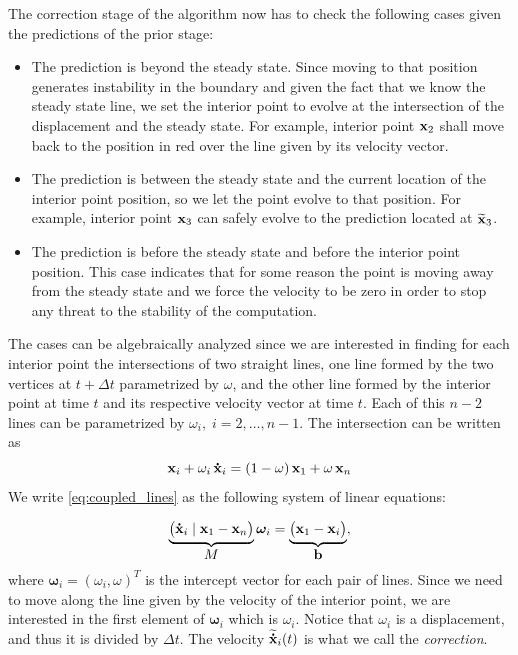 The correction stage of the algorithm now has to check the following cases given the predictions of the prior stage:
\begin{itemize}
    \item The prediction is beyond the steady state. 
    Since moving to that position generates instability in the boundary and given the fact that we know the steady state line, we set the interior point to evolve at the intersection of the displacement and the steady state. For example, interior point $\x_2$ shall move back to the position in red over the line given by its velocity vector.
    \item The prediction is between the steady state and the current location of the interior point position, so
    we let the point evolve to that position. 
    For example, interior point $\x_3$ can safely evolve to the prediction located at $\widetilde{\x}_3$.
    \item The prediction is before the steady state and before the interior point position.
    This case indicates that for some reason the point is moving away from the steady state and we force the velocity to be zero in order to stop any threat to the stability of the computation.
\end{itemize}
The cases can be algebraically analyzed since we are interested in finding for each interior point the intersections of two straight lines, one line formed by the two vertices at $t+\Delta t$ parametrized by $\omega$, and the other line formed by the interior point at time $t$ and its respective velocity vector at time $t$. Each of this $n-2$ lines can be parametrized by $\omega_i,\; i=2,\ldots,n-1$. The intersection can be written as
%
\begin{equation}
    \x_i + \omega_i\,\dotx_i=
    (1-\omega)\,\x_1 + \omega\, \x_n \label{eq:coupled_lines}
\end{equation}
%
We write \eqref{eq:coupled_lines} as the following system of linear equations:

\begin{equation*}
    \underbrace{\begin{pmatrix}
    \dotx_i \;|\; \x_1 - \x_n
    \end{pmatrix}}_{\displaystyle M} \bm{\omega}_i = \underbrace{\begin{pmatrix}
    \x_1 - \x_i
    \end{pmatrix}}_{\displaystyle \mathbf{b}},
\end{equation*}
where $\bm{\omega}_i = (\omega_i, \omega)^T$ is the intercept vector for each pair of lines. 
Since we need to move along the line given by the velocity of the interior point, we are interested in the first element of $\bm{\omega}_i$ which is $\omega_i$.
Notice that $\omega_i$ is a displacement, and thus it is divided by $\Delta t$. The velocity $\widetilde{\dotx}_i(t)$ is what we call the \emph{correction}.

